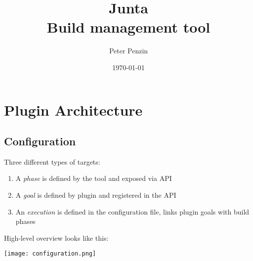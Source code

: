 \documentclass[11pt]{article}
\title{Junta\\Build management tool}
\author{Peter Penzin}
\date{\today}
\begin{document}
\maketitle

\section{Plugin Architecture}
\subsection{Configuration}
Three different types of targets:
\begin{enumerate}
\item A \textit{phase} is defined by the tool and exposed via API
\item A \textit{goal} is defined by plugin and registered in the API
\item An \textit{execution} is defined in the configuration file, links plugin goals with build phases
\end{enumerate}

High-level overview looks like this:

\texttt{[image: configuration.png]}
\end{document}
